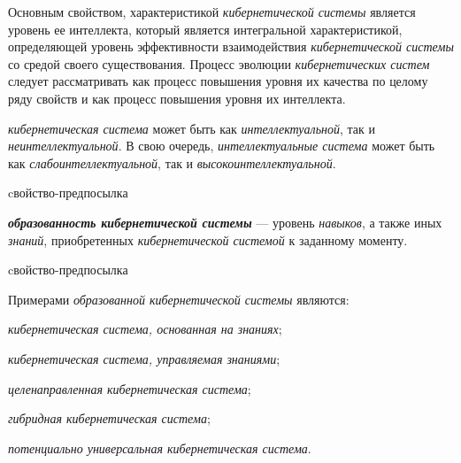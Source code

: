 Основным свойством, характеристикой \textit{кибернетической системы} является уровень ее интеллекта, который является интегральной характеристикой, определяющей уровень эффективности взаимодействия \textit{кибернетической системы} со средой своего существования.
Процесс эволюции \textit{кибернетических систем} следует рассматривать как процесс повышения уровня их качества по целому ряду свойств и как процесс повышения уровня их интеллекта.

\textit{кибернетическая система} может быть как \textit{интеллектуальной}, так и \textit{неинтеллектуальной}. В свою очередь, \textit{интеллектуальные система} может быть как \textit{слабоинтеллектуальной}, так и \textit{высокоинтеллектуальной}.

\begin{SCn}
\begin{scnrelfromlist}{cвойство-предпосылка}
\end{scnrelfromlist}
\end{SCn}

\textbf{\textit{образованность кибернетической системы}} --- уровень \textit{навыков}, а также иных \textit{знаний}, приобретенных \textit{кибернетической системой} к заданному моменту. 

\begin{SCn}
\begin{scnrelfromlist}{cвойство-предпосылка}
\end{scnrelfromlist}
\end{SCn}

Примерами \textit{образованной кибернетической системы} являются:
\begin{textitemize}
    \item \textit{кибернетическая система, основанная на знаниях};
    \item \textit{кибернетическая система, управляемая знаниями};
    \item \textit{целенаправленная кибернетическая система};
    \item \textit{гибридная кибернетическая система};
    \item \textit{потенциально универсальная кибернетическая система}.
\end{textitemize}

